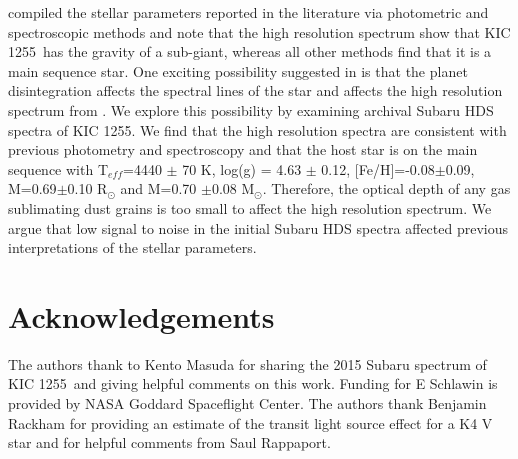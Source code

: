 \documentclass[preprint,trackchanges]{aastex61}
\newcommand{\shStar}{KIC 1255}
\begin{document}
\citet{vanlieshout2016kic1255} compiled the stellar parameters reported in the literature via photometric and spectroscopic methods and note that the high resolution spectrum show that \shStar\ has the gravity of a sub-giant, whereas all other methods find that it is a main sequence star.
One exciting possibility suggested in \citet{vanlieshout2016kic1255} is that the planet disintegration affects the spectral lines of the star and affects the high resolution spectrum from \citet{kawahara2013starspots}.
We explore this possibility by examining archival Subaru HDS spectra of \shStar.
We find that the high resolution spectra are consistent with previous photometry and spectroscopy and that the host star is on the main sequence with T$_{eff}$=4440 $\pm$ 70 K, log(g) = 4.63 $\pm$ 0.12, [Fe/H]=-0.08$\pm$0.09, M=0.69$\pm$0.10 R$_\odot$ and M=0.70 $\pm$0.08 M$_\odot$.
Therefore, the optical depth of any gas sublimating  dust grains is too small to affect  the high resolution spectrum.
We argue that low signal to noise in the initial Subaru HDS spectra affected previous interpretations of the stellar parameters.


\section{Acknowledgements}
The authors thank to Kento Masuda for sharing the 2015 Subaru spectrum of \shStar\ and giving helpful comments on this work.
Funding for E Schlawin is provided by NASA Goddard Spaceflight Center.
The authors thank Benjamin Rackham for providing an estimate of the transit light source effect for a K4 V star and for helpful comments from Saul Rappaport.



\end{document}
